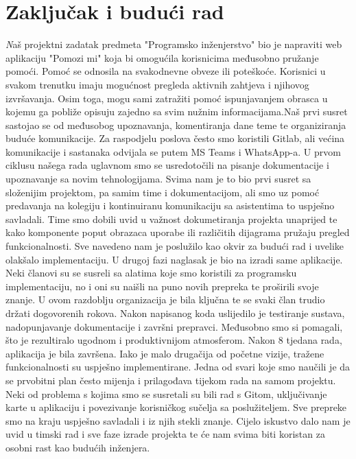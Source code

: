 \chapter{Zaključak i budući rad}
\textit
Naš projektni zadatak predmeta "Programsko inženjerstvo" bio je napraviti web aplikaciju "Pomozi mi" koja bi omogućila korisnicima međusobno pružanje pomoći. Pomoć se odnosila na svakodnevne obveze ili poteškoće. Korisnici u svakom trenutku imaju mogućnost pregleda aktivnih zahtjeva i njihovog izvršavanja. Osim toga, mogu sami zatražiti pomoć ispunjavanjem obrasca u kojemu ga pobliže opisuju zajedno sa svim nužnim informacijama.\newline Naš prvi susret sastojao se od međusobog upoznavanja, komentiranja dane teme te organiziranja buduće komunikacije. Za raspodjelu poslova često smo koristili Gitlab, ali većina komunikacije i sastanaka odvijala se putem MS Teams i WhatsApp-a. U prvom ciklusu našega rada uglavnom smo se usredotočili na pisanje dokumentacije i upoznavanje sa novim tehnologijama. Svima nam je to bio prvi susret sa složenijim projektom, pa samim time i dokumentacijom, ali smo uz pomoć predavanja na kolegiju i kontinuiranu komunikaciju sa asistentima to uspješno savladali. Time smo dobili uvid u važnost dokumetiranja projekta unaprijed te kako komponente poput obrazaca uporabe ili različitih dijagrama pružaju pregled funkcionalnosti. Sve navedeno nam je poslužilo kao okvir za budući rad i uvelike olakšalo implementaciju.\newline
U drugoj fazi naglasak je bio na izradi same aplikacije. Neki članovi su se susreli sa alatima koje smo koristili za programsku implementaciju, no i oni su naišli na puno novih prepreka te proširili svoje znanje. U ovom razdoblju organizacija je bila ključna te se svaki član trudio držati dogovorenih rokova. Nakon napisanog koda uslijedilo je testiranje sustava, nadopunjavanje dokumentacije i završni prepravci. Međusobno smo si pomagali, što je rezultiralo ugodnom i produktivnijom atmosferom.\newline
Nakon 8 tjedana rada, aplikacija je bila završena. Iako je malo drugačija od početne vizije, tražene funkcionalnosti su uspješno implementirane. Jedna od svari koje smo naučili je da se prvobitni plan često mijenja i prilagođava tijekom rada na samom projektu. Neki od problema s kojima smo se susretali su bili rad s Gitom, uključivanje karte u aplikaciju i povezivanje korisničkog sučelja sa poslužiteljem. Sve prepreke smo na kraju uspješno savladali i iz njih stekli znanje. Cijelo iskustvo dalo nam je uvid u timski rad i sve faze izrade projekta te će nam svima biti koristan za osobni rast kao budućih inženjera.